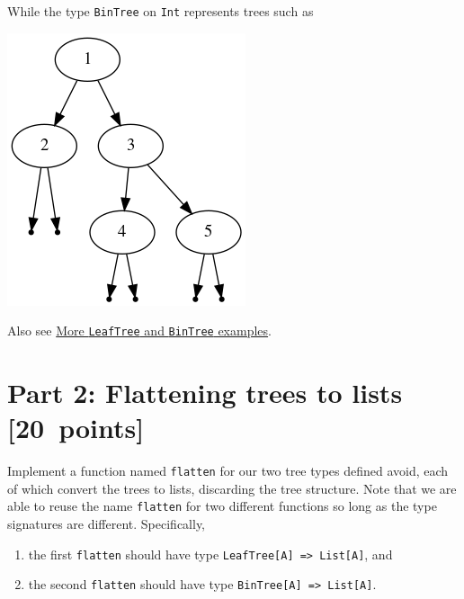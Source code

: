 \documentclass[11pt]{article}
\begin{document}
While the type \texttt{BinTree} on \texttt{Int} represents trees such as
\begin{center}
\includegraphics[width=\textwidth]{media/BinTree.png}
\end{center}

Also see \hyperref[sec:orgeb2101b]{More \texttt{LeafTree} and \texttt{BinTree} examples}.

\section*{Part 2: Flattening trees to lists          [20 points]}
\label{sec:orgdaae67d}
Implement a function named \texttt{flatten} for our two tree types
defined avoid, each of which convert the trees to lists,
discarding the tree structure.
Note that we are able to reuse the name \texttt{flatten} for two different
functions so long as the type signatures are different.
Specifically,
\begin{enumerate}
\item the first \texttt{flatten} should have type \texttt{LeafTree[A] => List[A]}, and
\item the second \texttt{flatten} should have type \texttt{BinTree[A] => List[A]}.
\end{enumerate}
\end{document}
